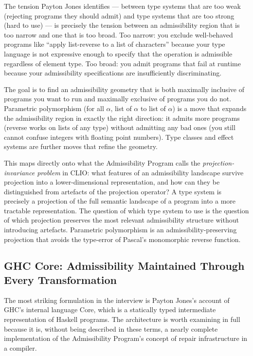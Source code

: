 \documentclass[12pt]{article}
\begin{document}
The tension Payton Jones identifies — between type systems that are too weak
(rejecting programs they should admit) and type systems that are too strong
(hard to use) — is precisely the tension between an admissibility region that
is too narrow and one that is too broad. Too narrow: you exclude well-behaved
programs like ``apply list-reverse to a list of characters'' because your type
language is not expressive enough to specify that the operation is admissible
regardless of element type. Too broad: you admit programs that fail at runtime
because your admissibility specifications are insufficiently discriminating.

The goal is to find an admissibility geometry that is both maximally inclusive
of programs you want to run and maximally exclusive of programs you do not.
Parametric polymorphism (for all $\alpha$, list of $\alpha$ to list of $\alpha$)
is a move that expands the admissibility region in exactly the right direction:
it admits more programs (reverse works on lists of any type) without admitting
any bad ones (you still cannot confuse integers with floating point numbers).
Type classes and effect systems are further moves that refine the geometry.

This maps directly onto what the Admissibility Program calls the
\emph{projection-invariance problem} in CLIO: what features of an admissibility
landscape survive projection into a lower-dimensional representation, and how
can they be distinguished from artefacts of the projection operator? A type
system is precisely a projection of the full semantic landscape of a program
into a more tractable representation. The question of which type system to use
is the question of which projection preserves the most relevant admissibility
structure without introducing artefacts. Parametric polymorphism is an
admissibility-preserving projection that avoids the type-error of Pascal's
monomorphic reverse function.

\subsection{GHC Core: Admissibility Maintained Through Every Transformation}

The most striking formulation in the interview is Payton Jones's account of
GHC's internal language Core, which is a statically typed intermediate
representation of Haskell programs. The architecture is worth examining in full
because it is, without being described in these terms, a nearly complete
implementation of the Admissibility Program's concept of repair infrastructure
in a compiler.
\end{document}
